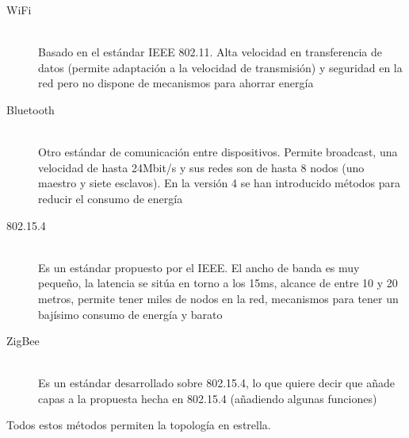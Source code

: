 \begin{description}
  \item[WiFi] \hfill \\
    Basado en el estándar IEEE 802.11. Alta velocidad en transferencia de datos
    (permite adaptación a la velocidad de transmisión) y seguridad en la red pero
    no dispone de mecanismos para ahorrar energía
  \item[Bluetooth] \hfill \\
    Otro estándar de comunicación entre dispositivos. Permite broadcast, una velocidad
    de hasta 24Mbit/s y sus redes son de hasta 8 nodos (uno maestro y siete esclavos).
    En la versión 4 se han introducido métodos para reducir el consumo de energía
  \item[802.15.4] \hfill \\
    Es un estándar propuesto por el IEEE. El ancho de banda es muy pequeño, la latencia
    se sitúa en torno a los 15ms, alcance de entre 10 y 20 metros, permite tener miles
    de nodos en la red, mecanismos para tener un bajísimo consumo de energía y barato
  \item[ZigBee] \hfill \\
    Es un estándar desarrollado sobre 802.15.4, lo que quiere decir que añade capas a la
    propuesta hecha en 802.15.4 (añadiendo algunas funciones)
\end{description}

Todos estos métodos permiten la topología en estrella.\\

